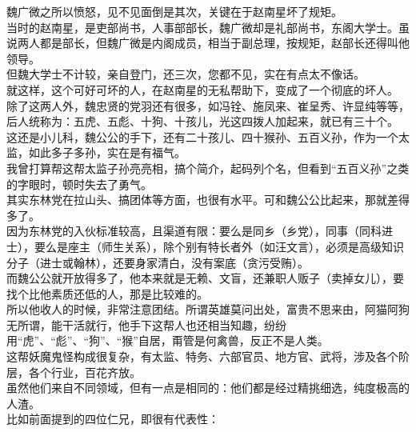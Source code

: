 \begin{multicols}{\theparacolNo}
魏广微之所以愤怒，见不见面倒是其次，关键在于赵南星坏了规矩。\\

当时的赵南星，是吏部尚书，人事部部长，魏广微却是礼部尚书，东阁大学士。虽说两人都是部长，但魏广微是内阁成员，相当于副总理，按规矩，赵部长还得叫他领导。\\

但魏大学士不计较，亲自登门，还三次，您都不见，实在有点太不像话。\\

就这样，这个可好可坏的人，在赵南星的无私帮助下，变成了一个彻底的坏人。\\

除了这两人外，魏忠贤的党羽还有很多，如冯铨、施凤来、崔呈秀、许显纯等等，后人统称为：五虎、五彪、十狗、十孩儿，光这四拨人加起来，就已有三十个。\\

这还是小儿科，魏公公的手下，还有二十孩儿、四十猴孙、五百义孙，作为一个太监，如此多子多孙，实在是有福气。\\

我曾打算帮这帮太监子孙亮亮相，搞个简介，起码列个名，但看到“五百义孙”之类的字眼时，顿时失去了勇气。\\

其实东林党在拉山头、搞团体等方面，也很有水平。可和魏公公比起来，那就差得多了。\\

因为东林党的入伙标准较高，且渠道有限：要么是同乡（乡党），同事（同科进士），要么是座主（师生关系），除个别有特长者外（如汪文言），必须是高级知识分子（进士或翰林），还要身家清白，没有案底（贪污受贿）。\\

而魏公公就开放得多了，他本来就是无赖、文盲，还兼职人贩子（卖掉女儿），要找个比他素质还低的人，那是比较难的。\\

所以他收人的时候，非常注意团结。所谓英雄莫问出处，富贵不思来由，阿猫阿狗无所谓，能干活就行，他手下这帮人也还相当知趣，纷纷用“虎”、“彪”、“狗”、“猴”自居，甭管是何禽兽，反正不是人类。\\

这帮妖魔鬼怪构成很复杂，有太监、特务、六部官员、地方官、武将，涉及各个阶层，各个行业，百花齐放。\\

虽然他们来自不同领域，但有一点是相同的：他们都是经过精挑细选，纯度极高的人渣。\\

比如前面提到的四位仁兄，即很有代表性：\\


\end{multicols}

